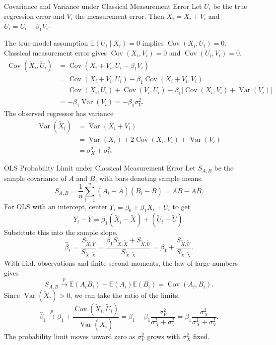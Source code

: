 \documentclass[notes,10pt, aspectratio=169]{beamer}
\begin{document}
\begin{frame}{Covariance and Variance under Classical Measurement Error}
\small
Let $U_i$ be the true regression error and $V_i$ the measurement error. Then
$\tilde X_i=X_i+V_i$ and $\tilde U_i=U_i-\beta_1 V_i$.

\medskip
The true-model assumption $\mathbb{E}(U_i\mid X_i)=0$ implies $\operatorname{Cov}(X_i,U_i)=0$.
Classical measurement error gives $\operatorname{Cov}(X_i,V_i)=0$ and $\operatorname{Cov}(U_i,V_i)=0$.
\[
\begin{aligned}
\operatorname{Cov}(\tilde X_i,\tilde U_i)
  &= \operatorname{Cov}(X_i+V_i,U_i-\beta_1 V_i) \\
  &= \operatorname{Cov}(X_i+V_i,U_i)-\beta_1\operatorname{Cov}(X_i+V_i,V_i) \\
  &= \operatorname{Cov}(X_i,U_i)+\operatorname{Cov}(V_i,U_i)
     -\beta_1\bigl[\operatorname{Cov}(X_i,V_i)+\operatorname{Var}(V_i)\bigr] \\
  &= -\beta_1\operatorname{Var}(V_i)=-\beta_1\sigma_V^2.
\end{aligned}
\]
The observed regressor has variance
\[
\begin{aligned}
\operatorname{Var}(\tilde X_i)
  &= \operatorname{Var}(X_i+V_i) \\
  &= \operatorname{Var}(X_i)+2\operatorname{Cov}(X_i,V_i)+\operatorname{Var}(V_i) \\
  &= \sigma_X^2+\sigma_V^2.
\end{aligned}
\]
\end{frame}

\begin{frame}{OLS Probability Limit under Classical Measurement Error}
\small
\setlength{\abovedisplayskip}{4pt}
\setlength{\belowdisplayskip}{4pt}
Let $S_{A,B}$ be the sample covariance of $A$ and $B$, with bars denoting sample means.
\[
S_{A,B}=\frac{1}{n}\sum_{i=1}^n(A_i-\bar A)(B_i-\bar B)
       =\overline{AB}-\bar A\bar B.
\]
For OLS with an intercept, center $Y_i=\beta_0+\beta_1\tilde X_i+\tilde U_i$ to get
\[
Y_i-\bar Y=\beta_1(\tilde X_i-\overline{\tilde X})+(\tilde U_i-\overline{\tilde U}).
\]
Substitute this into the sample slope.
\[
\hat\beta_1
=\frac{S_{\tilde X,Y}}{S_{\tilde X,\tilde X}}
=\frac{\beta_1 S_{\tilde X,\tilde X}+S_{\tilde X,\tilde U}}{S_{\tilde X,\tilde X}}
=\beta_1+\frac{S_{\tilde X,\tilde U}}{S_{\tilde X,\tilde X}}.
\]
With i.i.d. observations and finite second moments, the law of large numbers gives
\[
S_{A,B}\xrightarrow{p}\mathbb{E}(A_i B_i)-\mathbb{E}(A_i)\mathbb{E}(B_i)=\operatorname{Cov}(A_i,B_i).
\]
Since $\operatorname{Var}(\tilde X_i)>0$, we can take the ratio of the limits.
\[
\hat\beta_1\xrightarrow{p}
\beta_1+\frac{\operatorname{Cov}(\tilde X_i,\tilde U_i)}{\operatorname{Var}(\tilde X_i)}
=\beta_1-\beta_1\frac{\sigma_V^2}{\sigma_X^2+\sigma_V^2}
=\beta_1\frac{\sigma_X^2}{\sigma_X^2+\sigma_V^2}.
\]
The probability limit moves toward zero as $\sigma_V^2$ grows with $\sigma_X^2$ fixed.
\end{frame}
\end{document}
